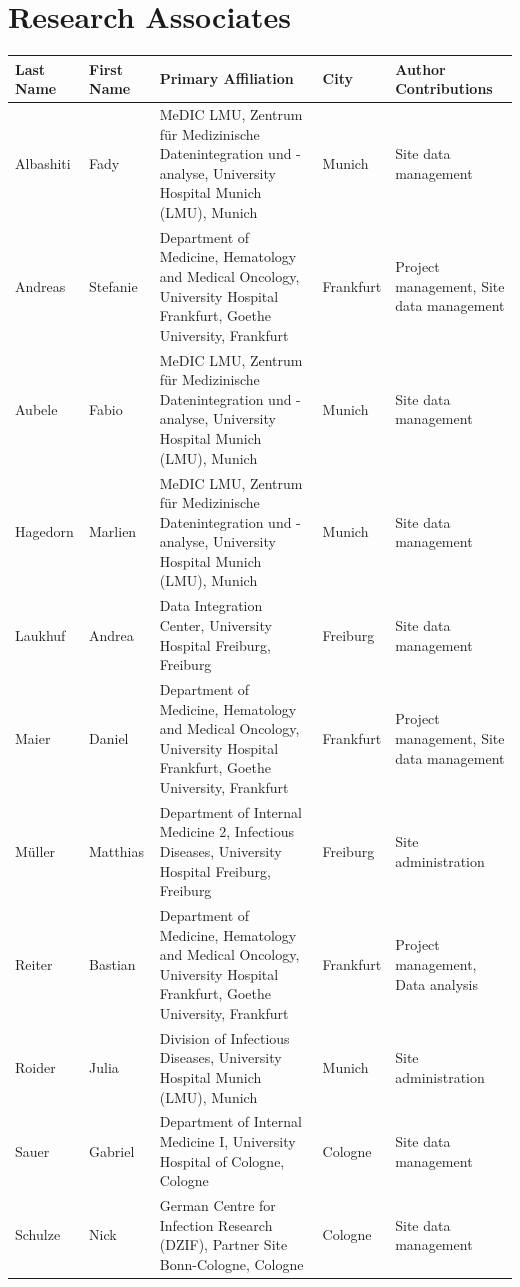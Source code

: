 \documentclass[
  letterpaper,
  DIV=11,
  numbers=noendperiod]{scrreprt}
\begin{document}
\hypertarget{research-associates}{%
\section{Research Associates}\label{research-associates}}

\begin{longtable*}{lllll}
\toprule
Last Name & First Name & Primary Affiliation & City & Author Contributions \\ 
\midrule
Albashiti & Fady & MeDIC LMU, Zentrum für Medizinische Datenintegration und -analyse, University Hospital Munich (LMU), Munich & Munich & Site data management \\ 
Andreas & Stefanie & Department of Medicine, Hematology and Medical Oncology, University Hospital Frankfurt, Goethe University, Frankfurt & Frankfurt & Project management, Site data management \\ 
Aubele & Fabio & MeDIC LMU, Zentrum für Medizinische Datenintegration und -analyse, University Hospital Munich (LMU), Munich & Munich & Site data management \\ 
Hagedorn & Marlien & MeDIC LMU, Zentrum für Medizinische Datenintegration und -analyse, University Hospital Munich (LMU), Munich & Munich & Site data management \\ 
Laukhuf & Andrea & Data Integration Center, University Hospital Freiburg, Freiburg & Freiburg & Site data management \\ 
Maier & Daniel & Department of Medicine, Hematology and Medical Oncology, University Hospital Frankfurt, Goethe University, Frankfurt & Frankfurt & Project management, Site data management \\ 
Müller & Matthias & Department of Internal Medicine 2, Infectious Diseases, University Hospital Freiburg, Freiburg & Freiburg & Site administration \\ 
Reiter & Bastian & Department of Medicine, Hematology and Medical Oncology, University Hospital Frankfurt, Goethe University, Frankfurt & Frankfurt & Project management, Data analysis \\ 
Roider & Julia & Division of Infectious Diseases, University Hospital Munich (LMU), Munich & Munich & Site administration \\ 
Sauer & Gabriel & Department of Internal Medicine I, University Hospital of Cologne, Cologne & Cologne & Site data management \\ 
Schulze & Nick & German Centre for Infection Research (DZIF), Partner Site Bonn-Cologne, Cologne & Cologne & Site data management \\ 

\end{longtable*}
\end{document}
